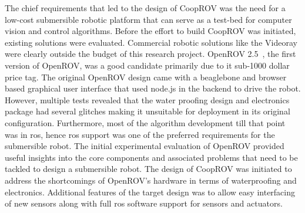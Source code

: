 \documentclass {udthesis}
\begin{document}
The chief requirements that led to the design of CoopROV was the need for a low-cost submersible robotic platform that can serve as a test-bed for computer vision and control algorithms. Before the effort to build CoopROV was initiated, existing solutions were evaluated. Commercial robotic solutions like the Videoray were clearly outside the budget of this research project. OpenROV 2.5~\cite{openrov}, the first version of OpenROV, was a good candidate primarily due to it sub-1000 dollar price tag. The original OpenROV design came with a beaglebone and browser based graphical user interface that used node.js \cite{nodejs} in the backend to drive the robot. However, multiple tests revealed that the water proofing design and electronics package had several glitches making it unsuitable for deployment in its original configuration. Furthermore, most of the algorithm development till that point was in \gls{ros}, hence \gls{ros} support was one of the 
preferred requirements for the submersible robot. The initial experimental evaluation of OpenROV provided useful insights into the core components and associated problems that need to be tackled to design a submersible robot. The design of CoopROV was initiated to address the shortcomings of OpenROV's hardware in terms of waterproofing and electronics. Additional features of the target design was to allow easy interfacing of new sensors along with full \gls{ros} software support for sensors and actuators.
\end{document}
